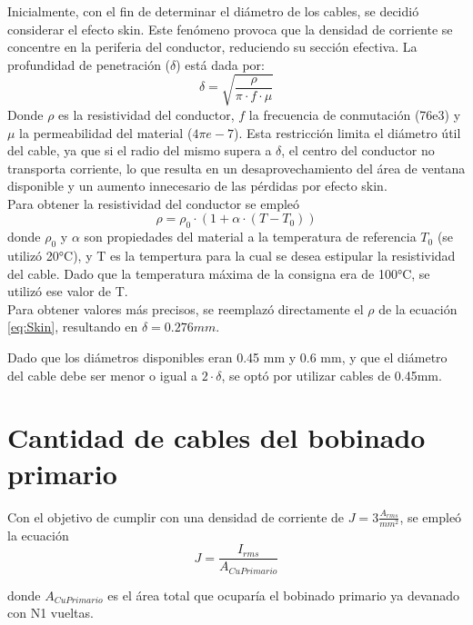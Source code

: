 \documentclass{article}
\begin{document}
Inicialmente, con el fin de determinar el diámetro de los cables, se decidió considerar el efecto skin. Este fenómeno provoca que la densidad de corriente se concentre en la periferia del conductor, reduciendo su sección efectiva. La profundidad de penetración ($\delta$) está dada por:
\begin{equation}
    \delta = \sqrt{\frac{\rho}{\pi \cdot f \cdot \mu}}
    \label{eq:Skin}
\end{equation}
Donde $\rho$ es la resistividad del conductor, $f$ la frecuencia de conmutación (76e3) y $\mu$ la permeabilidad del material ($ 4 \pi e-7 $). Esta restricción limita el diámetro útil del cable, ya que si el radio del mismo supera a $\delta$, el centro del conductor no transporta corriente, lo que resulta en un desaprovechamiento del área de ventana disponible y un aumento innecesario de las pérdidas por efecto skin. \\

Para obtener la resistividad del conductor se empleó
\begin{equation*}
    \rho = \rho_0 \cdot (1 + \alpha \cdot (T - T_0))
\end{equation*}
donde $ \rho_0 $ y $ \alpha $ son propiedades del material a la temperatura de referencia $ T_0 $ (se utilizó 20°C), y T es la tempertura para la cual se desea estipular la resistividad del cable. Dado que la temperatura máxima de la consigna era de 100°C, se utilizó ese valor de T. 
\\ Para obtener valores más precisos, se reemplazó directamente el $\rho$ de la ecuación \ref{eq:Skin}, resultando en $ \delta = 0.276 mm $.

Dado que los diámetros disponibles eran 0.45 mm y 0.6 mm, y que el diámetro del cable debe ser menor o igual a $ 2 \cdot \delta$, se optó por utilizar cables de 0.45mm.


\section{Cantidad de cables del bobinado primario}

Con el objetivo de cumplir con una densidad de corriente de $ J = 3 \frac{A_{rms}}{mm^2} $, se empleó la ecuación 
\begin{equation}
    J = \frac{I_{rms}}{A_{CuPrimario}}
\end{equation}

donde $ A_{CuPrimario} $ es el área total que ocuparía el bobinado primario ya devanado con N1 vueltas.
\end{document}
